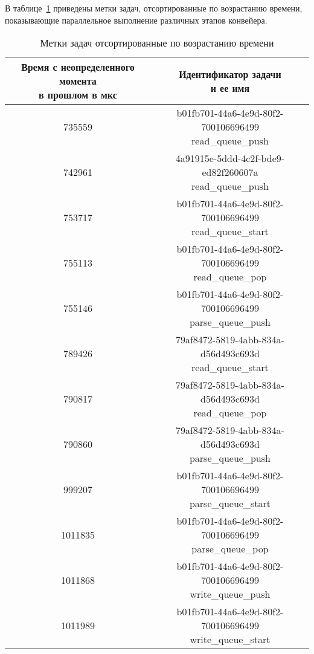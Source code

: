 В таблице~\ref{tab:distribution} приведены метки задач, отсортированные по возрастанию времени, показывающие параллельное выполнение различных этапов конвейера.

\begin{table}[H]
	\caption{Метки задач отсортированные по возрастанию времени}
	\label{tab:distribution}
	\centering
	\begin{tabular}{|c|c|}
		\hline
		\shortstack{Время с неопределенного момента\\в прошлом в мкс} & \shortstack{Идентификатор задачи\\ и ее имя}\\\hline
		735559 & \shortstack{b01fb701-44a6-4e9d-80f2-700106696499\\read\_queue\_push}\\\hline
		742961 & \shortstack{4a91915e-5ddd-4c2f-bde9-ed82f260607a\\read\_queue\_push}\\\hline
		753717 & \shortstack{b01fb701-44a6-4e9d-80f2-700106696499\\read\_queue\_start}\\\hline
		755113 & \shortstack{b01fb701-44a6-4e9d-80f2-700106696499\\read\_queue\_pop}\\\hline
		755146 & \shortstack{b01fb701-44a6-4e9d-80f2-700106696499\\parse\_queue\_push}\\\hline
		789426 & \shortstack{79af8472-5819-4abb-834a-d56d493c693d\\read\_queue\_start}\\\hline
		790817 & \shortstack{79af8472-5819-4abb-834a-d56d493c693d\\read\_queue\_pop}\\\hline
		790860 & \shortstack{79af8472-5819-4abb-834a-d56d493c693d\\parse\_queue\_push}\\\hline
		999207 & \shortstack{b01fb701-44a6-4e9d-80f2-700106696499\\parse\_queue\_start}\\\hline
		1011835 & \shortstack{b01fb701-44a6-4e9d-80f2-700106696499\\parse\_queue\_pop}\\\hline
		1011868 & \shortstack{b01fb701-44a6-4e9d-80f2-700106696499\\write\_queue\_push}\\\hline
		1011989 & \shortstack{b01fb701-44a6-4e9d-80f2-700106696499\\write\_queue\_start}\\\hline

\end{tabular}
\end{table}
